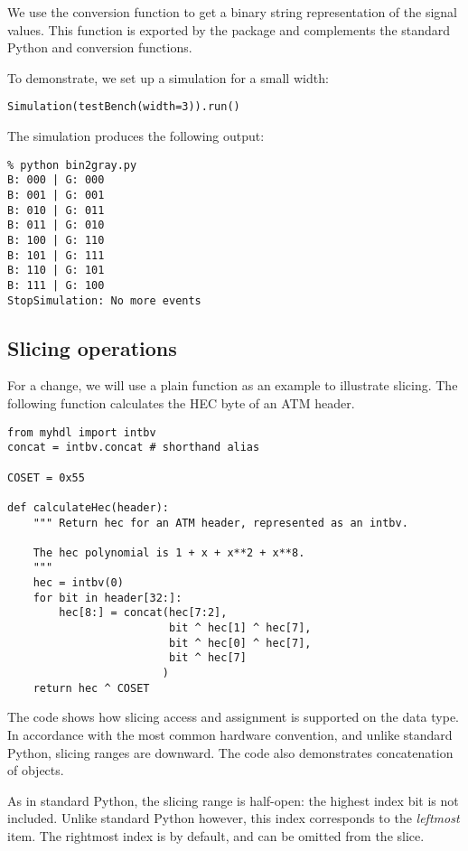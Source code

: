 We use the conversion function  to get a binary
string representation of the signal values. This function is exported
by the  package and complements the standard Python
 and  conversion functions.

To demonstrate, we set up a simulation for a small width: 

\begin{verbatim}
Simulation(testBench(width=3)).run()
\end{verbatim}

The simulation produces the following output:

\begin{verbatim}
% python bin2gray.py
B: 000 | G: 000
B: 001 | G: 001
B: 010 | G: 011
B: 011 | G: 010
B: 100 | G: 110
B: 101 | G: 111
B: 110 | G: 101
B: 111 | G: 100
StopSimulation: No more events
\end{verbatim}

\subsection{Slicing operations}

For a change, we will use a plain function as an example to illustrate
slicing.  The following function calculates the HEC byte of an ATM
header.

\begin{verbatim}
from myhdl import intbv
concat = intbv.concat # shorthand alias

COSET = 0x55

def calculateHec(header):
    """ Return hec for an ATM header, represented as an intbv.

    The hec polynomial is 1 + x + x**2 + x**8.
    """
    hec = intbv(0)
    for bit in header[32:]:
        hec[8:] = concat(hec[7:2],
                         bit ^ hec[1] ^ hec[7],
                         bit ^ hec[0] ^ hec[7],
                         bit ^ hec[7]
                        )
    return hec ^ COSET
\end{verbatim}

The code shows how slicing access and assignment is supported on the
 data type. In accordance with the most common hardware
convention, and unlike standard Python, slicing ranges are
downward. The code also demonstrates concatenation of 
objects.

As in standard Python, the slicing range is half-open: the highest
index bit is not included. Unlike standard Python however, this index
corresponds to the \emph{leftmost} item. The rightmost index is
 by default, and can be omitted from the slice.

